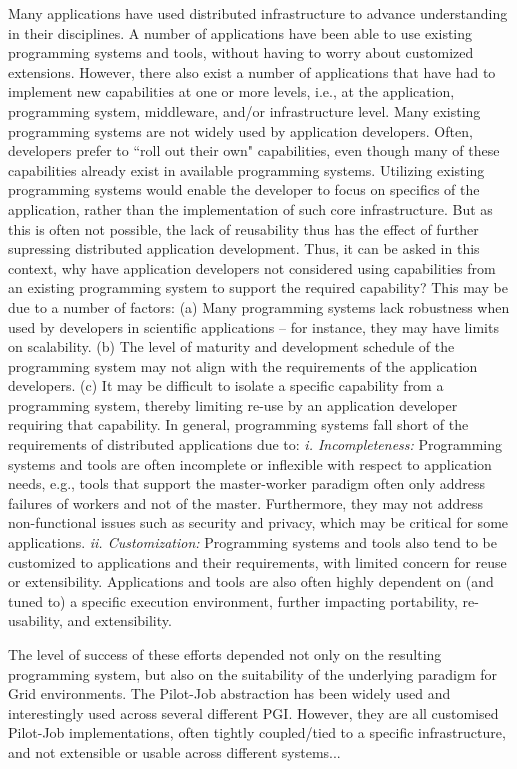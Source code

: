 \documentclass[conference,final]{IEEEtran}
\begin{document}
Many applications have used distributed infrastructure to advance
understanding in their disciplines. A number of applications have been
able to use existing programming systems and tools, without having to
worry about customized extensions. However, there also exist a number
of applications that have had to implement new capabilities at one or
more levels, i.e., at the application, programming system, middleware,
and/or infrastructure level.  Many existing programming systems are
not widely used by application developers. Often, developers prefer to
``roll out their own" capabilities, even though many of these
capabilities already exist in available programming systems.
Utilizing existing programming systems would enable the developer to
focus on specifics of the application, rather than the implementation
of such core infrastructure. But as this is often not possible, the
lack of reusability thus has the effect of further supressing
distributed application development. Thus, it can be asked in this
context, why have application developers not considered using
capabilities from an existing programming system to support the
required capability? This may be due to a number of factors: (a) Many
programming systems lack robustness when used by developers in
scientific applications -- for instance, they may have limits on
scalability. (b) The level of maturity and development schedule of the
programming system may not align with the requirements of the
application developers. (c) It may be difficult to isolate a specific
capability from a programming system, thereby limiting re-use by an
application developer requiring that capability. In general,
programming systems fall short of the requirements of distributed
applications due to: {\em i. Incompleteness:} Programming systems and
tools are often incomplete or inflexible with respect to application
needs, e.g., tools that support the master-worker paradigm often only
address failures of workers and not of the master. Furthermore, they
may not address non-functional issues such as security and privacy,
which may be critical for some applications.  {\em ii. Customization:}
Programming systems and tools also tend to be customized to
applications and their requirements, with limited concern for reuse or
extensibility.  Applications and tools are also often highly dependent
on (and tuned to) a specific execution environment, further impacting
portability, re-usability, and extensibility.

The level of success of these efforts depended not only on the
resulting programming system, but also on the suitability of the
underlying paradigm for Grid environments. The Pilot-Job abstraction
has been widely used and interestingly used across several different
PGI. However, they are all customised Pilot-Job implementations, often
tightly coupled/tied to a specific infrastructure, and not extensible
or usable across different systems...
\end{document}
